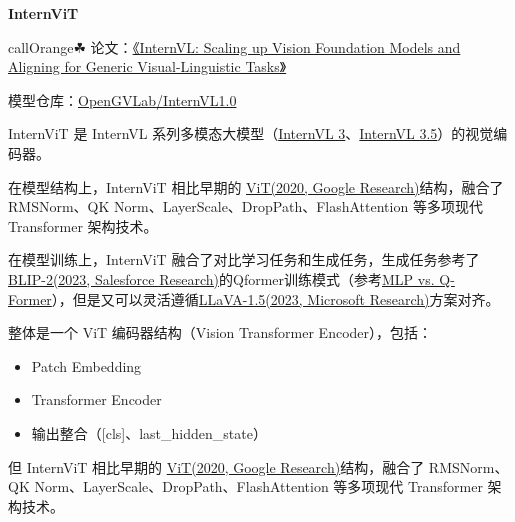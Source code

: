 \documentclass[zihao=false,fontset=windows]{ctexart}
\begin{document}
{\bfseries InternViT\par}
\begin{feishubox}{callOrange}{☘}
论文：\href{https://arxiv.org/pdf/2312.14238}{《InternVL: Scaling up Vision Foundation Models and Aligning for Generic Visual-Linguistic Tasks》}\par
模型仓库：\href{https://huggingface.co/collections/OpenGVLab/internvl10-65b92d6be81c86166ca0dde4}{OpenGVLab}\href{https://huggingface.co/collections/OpenGVLab/internvl10-65b92d6be81c86166ca0dde4}{/InternVL1.0}\par
\end{feishubox}

InternViT 是 InternVL 系列多模态大模型（\href{https://scnajei2ds6y.feishu.cn/wiki/IOYWwSHmKib7TokydUdcHxFznIU}{InternVL 3}、\href{https://scnajei2ds6y.feishu.cn/wiki/JDc4wjjcIiKRhtkXj45cT78fnz9}{InternVL 3.5}）的视觉编码器。\par
在模型结构上，InternViT 相比早期的 \href{https://scnajei2ds6y.feishu.cn/wiki/QEJ8wXq9GiTBrxkMqbScnd8nnod}{ViT(2020, Google Research)}结构，融合了 RMSNorm、QK Norm、LayerScale、DropPath、FlashAttention 等多项现代 Transformer 架构技术。\par
在模型训练上，InternViT \textcolor{feishuRed}{融合了对比学习任务和生成任务}，生成任务参考了\href{https://scnajei2ds6y.feishu.cn/wiki/AZiVwFmXEirI77kAVzYcOMNVnbh}{BLIP-2(2023, Salesforce Research)}的Qformer训练模式（参考\href{https://scnajei2ds6y.feishu.cn/wiki/Lu0owe0xii7LjmkfyNzc0mdjnEh}{MLP vs. Q-Former}），但是又可以灵活遵循\href{https://scnajei2ds6y.feishu.cn/wiki/HTJVw44IJibX6gkYWtlc1zCYnVh}{LLaVA-1.5(2023, Microsoft Research)}方案对齐。\par
\par\vspace{0.95em}\par\vspace{0.28em}
整体是一个 ViT 编码器结构（Vision Transformer Encoder），包括：\par
\begin{itemize}
\item Patch Embedding
\end{itemize}
\begin{itemize}
\item Transformer Encoder
\end{itemize}
\begin{itemize}
\item 输出整合（[cls]、last\_hidden\_state）
\end{itemize}
但 InternViT 相比早期的 \href{https://scnajei2ds6y.feishu.cn/wiki/QEJ8wXq9GiTBrxkMqbScnd8nnod}{ViT(2020, Google Research)}结构，融合了 RMSNorm、QK Norm、LayerScale、DropPath、FlashAttention 等多项现代 Transformer 架构技术。\par
\end{document}
